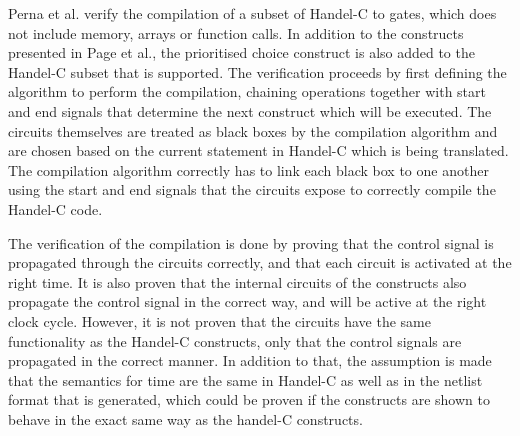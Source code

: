 Perna et al. verify the compilation of a subset of Handel-C to gates, which does not include memory,
arrays or function calls.  In addition to the constructs presented in Page et al., the prioritised
choice construct is also added to the Handel-C subset that is supported.  The verification proceeds
by first defining the algorithm to perform the compilation, chaining operations together with start
and end signals that determine the next construct which will be executed.  The circuits themselves
are treated as black boxes by the compilation algorithm and are chosen based on the current
statement in Handel-C which is being translated.  The compilation algorithm correctly has to link
each black box to one another using the start and end signals that the circuits expose to correctly
compile the Handel-C code.

The verification of the compilation is done by proving that the control signal is propagated through
the circuits correctly, and that each circuit is activated at the right time.  It is also proven
that the internal circuits of the constructs also propagate the control signal in the correct way,
and will be active at the right clock cycle.  However, it is not proven that the circuits have the
same functionality as the Handel-C constructs, only that the control signals are propagated in the
correct manner.  In addition to that, the assumption is made that the semantics for time are the
same in Handel-C as well as in the netlist format that is generated, which could be proven if the
constructs are shown to behave in the exact same way as the handel-C constructs.

